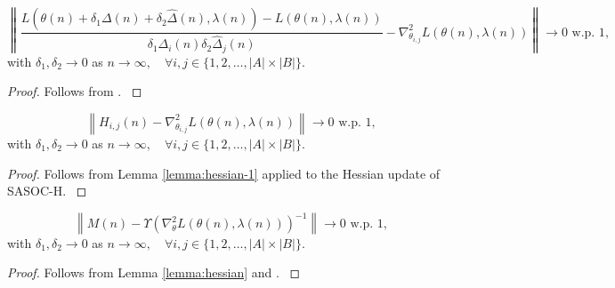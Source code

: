 \documentclass[11pt,letterpaper,english]{article}
\begin{document}
\begin{lemma}
\label{lemma:hessian-1}
\[\left \| \dfrac{L(\theta(n) + \delta_1 \Delta(n) + \delta_2 \widehat\Delta(n), \lambda(n)) - L(\theta(n),\lambda(n))}{\delta_1 \Delta_i(n) \delta_2 \widehat\Delta_j(n)} - \nabla^2_{\theta_{i, j}} L(\theta(n), \lambda(n)) \right \| \rightarrow 0\textrm{ w.p. 1},
\]
with $\delta_1, \delta_2 \rightarrow 0$ as $n \rightarrow \infty, \quad \forall i, j \in \{1, 2, \dots, |A| \times |B| \}$.
\begin{proof}
{
\rm
Follows from \cite[Proposition 4.9]{shalabh2011constrained}.
}
\end{proof}
\end{lemma}

\begin{lemma}
\label{lemma:hessian}
\[\left \| H_{i, j}(n) - \nabla^2_{\theta_{i, j}} L(\theta(n), \lambda(n)) \right \| \rightarrow 0\textrm{ w.p. 1},
\]
with $\delta_1, \delta_2 \rightarrow 0$ as $n \rightarrow \infty, \quad \forall i, j \in \{1, 2, \dots, |A| \times |B| \}$.

\begin{proof}
{\rm
Follows from Lemma \ref{lemma:hessian-1} applied to the Hessian update of SASOC-H.
}
\end{proof}
\end{lemma}

\begin{lemma}
\label{lemma:inverse-hessian}
\[\left \| M(n) - \Upsilon(\nabla^2_{\theta} L(\theta(n), \lambda(n)))^{-1} \right \| \rightarrow 0\textrm{ w.p. 1},
\]
with $\delta_1, \delta_2 \rightarrow 0$ as $n \rightarrow \infty, \quad \forall i, j \in \{1, 2, \dots, |A| \times |B| \}$.

\begin{proof}
{\rm
Follows from Lemma \ref{lemma:hessian} and \cite[Lemma A.9]{bhatnagar2007adaptive}.
}
\end{proof}
\end{lemma}
\end{document}
